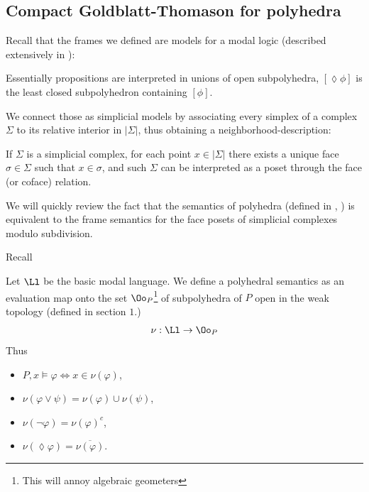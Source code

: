\subsection{Compact Goldblatt-Thomason for polyhedra}

Recall that the frames we defined are models for a modal logic (described extensively in \cite{DBLP}):

Essentially propositions are interpreted in unions of open subpolyhedra, $[\lozenge\phi]$ is the least closed subpolyhedron containing $[\phi]$.

We connect those as simplicial models by associating every simplex of a complex $\Sigma$ to its relative interior in $|\Sigma|$, thus obtaining a neighborhood-description:

\begin{corollary}
    If $\Sigma$ is a simplicial complex, for each point $x\in |\Sigma|$ there exists a unique face $\sigma\in\Sigma$ such that $x\in \sigma$, and 
    such $\Sigma$ can be interpreted as a poset through the face (or coface) relation.
\end{corollary}

We will quickly review the fact that the semantics of polyhedra (defined in \cite{Dekker}, \cite{DBLP}) is equivalent to the frame semantics for the face posets of simplicial complexes modulo subdivision.

Recall
\begin{definition}
Let $\Ll$ be the basic modal language. We define a polyhedral semantics as an evaluation map onto the set $\Oo_P$\footnote{This will annoy algebraic geometers}
 of subpolyhedra of $P$ open in the weak topology (defined in section $1$.)
\[\nu: \Ll \to \Oo_P\]
Thus 
\begin{itemize}
    \item $P,x\models\varphi\iff x\in \nu(\varphi)$,
    \item $\nu(\varphi\vee\psi)=\nu(\varphi)\cup\nu(\psi)$,
    \item $\nu(\lnot\varphi)=\nu(\varphi)^c$,
    \item $\nu(\lozenge\varphi)=\overline{\nu(\varphi)}$.
\end{itemize}
\end{definition} 

